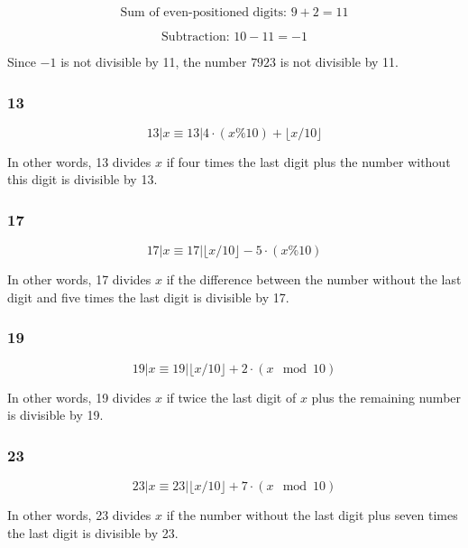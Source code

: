 \[
\text{Sum of even-positioned digits: } 9 + 2 = 11
\]

\[
\text{Subtraction: } 10 - 11 = -1
\]

Since \(-1\) is not divisible by 11, the number \(7923\) is not divisible by 11.

\subsubsection{13}

\begin{equation}
    13 | x \equiv 13 | 4 \cdot (x\%10) + \lfloor x/10 \rfloor
\end{equation}

In other words, 13 divides $x$ if four times the last digit plus the number without this digit is divisible by 13.

\subsubsection{17}

\begin{equation}
    17 | x \equiv 17 |  \lfloor x/10 \rfloor - 5 \cdot (x \% 10)
\end{equation}

In other words, 17 divides $x$ if the difference between the number without the last digit and five times the last digit is divisible by 17.

\subsubsection{19}

\begin{equation}
    19 | x \equiv 19 | \lfloor x / 10 \rfloor + 2 \cdot (x \mod 10)
\end{equation}

In other words, 19 divides $x$ if twice the last digit of $x$ plus the remaining number is divisible by 19.

\subsubsection{23}

\begin{equation}
    23 | x \equiv 23 | \lfloor x / 10 \rfloor + 7 \cdot (x \mod 10)
\end{equation}

In other words, 23 divides $x$ if the number without the last digit plus seven times the last digit is divisible by 23.

